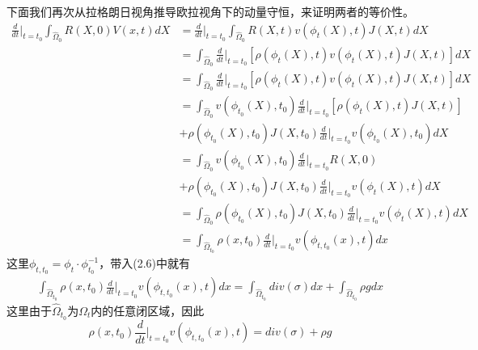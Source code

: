 下面我们再次从拉格朗日视角推导欧拉视角下的动量守恒，来证明两者的等价性。
\begin{equation}
    \begin{split}
        \frac{d}{dt}\Big |_{t = t_0}\int_{\hat{\Omega}_0}R(X,0)V(x,t)dX &= \frac{d}{dt}\Big |_{t = t_0} \int_{\hat{\Omega}_0}R(X,t)v(\phi_t(X),t)J(X,t)dX\\
        &=\int_{\hat{\Omega}_0} \frac{d}{dt}\Big |_{t = t_0} [\rho(\phi_t(X),t)v(\phi_t(X),t)J(X,t)]dX\\
        &=\int_{\hat{\Omega}_0} \frac{d}{dt}\Big |_{t = t_0} [\rho(\phi_t(X),t)v(\phi_t(X),t)J(X,t)]dX\\
        &=\int_{\hat{\Omega}_0} v(\phi_{t_0}(X),t_0)\frac{d}{dt}\Big |_{t = t_0}[\rho(\phi_t(X),t) J(X,t)] \\
        &+ \rho(\phi_{t_0}(X),{t_0})J(X,t_0)\frac{d}{dt}\Big |_{t = t_0} v(\phi_{t_0}(X),t_0) dX\nonumber\\
        &=\int_{\hat{\Omega}_0}v(\phi_{t_0}(X),t_0)\frac{d}{dt}\Big |_{t = t_0}R(X,0) \\
        &+ \rho(\phi_{t_0}(X),{t_0})J(X,t_0)\frac{d}{dt}\Big |_{t = t_0} v(\phi_{t}(X),t)dX\\
        &=\int_{\hat{\Omega}_0}\rho(\phi_{t_0}(X),{t_0})J(X,t_0)\frac{d}{dt}\Big |_{t = t_0} v(\phi_{t}(X),t)dX\\
        &=\int_{\hat{\Omega}_{t_0}}\rho(x,t_0)\frac{d}{dt}\Big |_{t = t_0} v(\phi_{t,t_0}(x),t)dx\nonumber
    \end{split}
\end{equation}
这里$\phi_{t,t_0} = \phi_t \cdot \phi_{t_0}^{-1}$，带入(2.6)中就有
\begin{equation}
    \begin{split}
        \int_{\hat{\Omega}_{t_0}}\rho(x,t_0)\frac{d}{dt}\Big |_{t = t_0} v(\phi_{t,t_0}(x),t)dx = \int_{\hat{\Omega}_{t_0}} div(\sigma) dx + \int_{\hat{\Omega}_{t_0}} \rho g dx\nonumber
    \end{split}
\end{equation}
这里由于$\hat{\Omega}_{t_0}$为$\Omega_t$内的任意闭区域，因此
$$\rho(x,t_0)\frac{d}{dt}\Big |_{t = t_0} v(\phi_{t,t_0}(x),t) = div(\sigma) + \rho g$$

